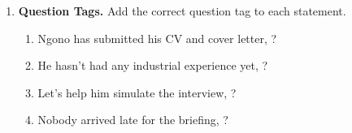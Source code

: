 \documentclass[11pt]{article}
\begin{document}
\begin{exercice}
\begin{enumerate}
\begin{enumerate}
        \item Please do not \underline{postpone} the meeting; the deadline is tight.
    \end{enumerate}
    \item \textbf{Question Tags.} Add the correct question tag to each statement.
    \begin{enumerate}
        \item Ngono has submitted his CV and cover letter, \underline{\hspace{3cm}}?
        \item He hasn't had any industrial experience yet, \underline{\hspace{3cm}}?
        \item Let's help him simulate the interview, \underline{\hspace{3cm}}?
        \item Nobody arrived late for the briefing, \underline{\hspace{3cm}}?
    \end{enumerate}
\end{enumerate}
\end{exercice}
\end{document}
